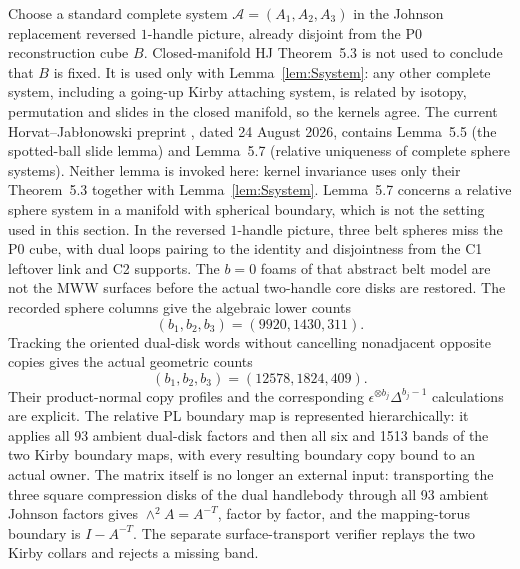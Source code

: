 Choose a standard complete system
\(\mathcal A=(A_1,A_2,A_3)\) in the Johnson replacement reversed
$1$-handle picture, already disjoint from the P0 reconstruction cube $B$.
Closed-manifold HJ Theorem~5.3 is not used to conclude that $B$ is fixed.
It is used only with Lemma~\ref{lem:Ssystem}: any other complete system,
including a going-up Kirby attaching system, is related by isotopy,
permutation and slides in the closed manifold, so the kernels agree.
The current Horvat--Jab\l{}onowski preprint \cite{HorvatJablonowski2025},
dated 24 August 2026, contains Lemma~5.5 (the spotted-ball slide lemma) and
Lemma~5.7 (relative uniqueness of complete sphere systems).  Neither lemma
is invoked here: kernel invariance uses only their Theorem~5.3 together with
Lemma~\ref{lem:Ssystem}.  Lemma~5.7 concerns a relative sphere system in a
manifold with spherical boundary, which is not the setting used in this
section.
In the reversed $1$-handle picture, three belt spheres miss the P0 cube,
with dual loops pairing to the identity and disjointness from the C1 leftover
link and C2 supports.  The $b=0$ foams of that abstract belt model are not the
MWW surfaces before the actual two-handle core disks are restored.  The
recorded sphere columns give the algebraic lower counts
\[
(b_1,b_2,b_3)=(9920,1430,311).
\]
Tracking the oriented dual-disk words without cancelling nonadjacent opposite
copies gives the actual geometric counts
\[
(b_1,b_2,b_3)=(12578,1824,409).
\]
Their product-normal copy profiles and the corresponding
$\epsilon^{\otimes b_j}\Delta^{b_j-1}$ calculations are explicit.  The
relative PL boundary map is represented hierarchically: it applies all 93
ambient dual-disk factors and then all six and 1513 bands of the two Kirby
boundary maps, with every resulting boundary copy bound to an actual owner.
The matrix itself is no longer an external input: transporting the three
square compression disks of the dual handlebody through all 93 ambient
Johnson factors gives $\wedge^2A=A^{-T}$, factor by factor, and the
mapping-torus boundary is $I-A^{-T}$.  The separate surface-transport
verifier replays the two Kirby collars and rejects a missing band.

